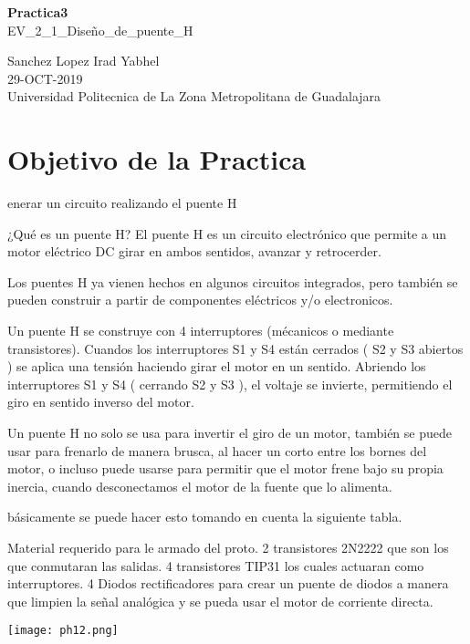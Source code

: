 \documentclass[11pt,a4paper]{article}
\begin{document}
\begin{center}
\textbf{Practica3}\\ 
EV_2_1_Diseño_de_puente_H
\end{center}

\begin{center}
Sanchez Lopez Irad Yabhel\\
29-OCT-2019\\
Universidad Politecnica de La Zona Metropolitana de Guadalajara
\end{center}


\section{Objetivo de la Practica}

enerar un circuito realizando el puente H 

¿Qué es un puente H?
El puente H  es un circuito electrónico que permite a un motor eléctrico DC girar en ambos sentidos, avanzar y retrocerder.

Los puentes H ya vienen hechos en algunos circuitos integrados, pero también se pueden construir a partir de componentes eléctricos y/o electronicos.

Un puente H se construye con 4 interruptores (mécanicos o mediante transistores). Cuandos los interruptores S1 y S4 están cerrados ( S2 y S3 abiertos ) se aplica una tensión haciendo girar el motor en un sentido. Abriendo los interruptores S1 y S4 ( cerrando S2 y S3 ), el voltaje se invierte, permitiendo el giro en sentido inverso del motor.

Un puente H no solo se usa para invertir el giro de un motor, también se puede usar para frenarlo de manera brusca, al hacer un corto entre los bornes del motor, o incluso puede usarse para permitir que el motor frene bajo su propia inercia, cuando desconectamos el motor de la fuente que lo alimenta.

básicamente se puede hacer esto tomando en cuenta la siguiente tabla.

Material requerido para le armado del proto.
2 transistores 2N2222 que son los que conmutaran las salidas.
4 transistores TIP31 los cuales actuaran como interruptores.
4 Diodos rectificadores para crear un puente de diodos a manera que limpien la señal analógica y se pueda usar el motor de corriente directa.

\texttt{[image: ph12.png]} 
\end{document}
